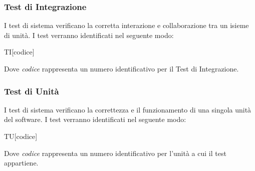 \documentclass[../piano-di-qualifica.tex]{subfiles}
\begin{document}
  \subsubsection{Test di Integrazione}
  \label{subs:integrazione}
    I test di sistema verificano la corretta interazione e collaborazione tra un isieme di unità. I test verranno identificati nel seguente modo:
    \begin{center}
      TI[codice]
    \end{center}
    Dove \textit{codice} rappresenta un numero identificativo per il Test di Integrazione.
  \subsubsection{Test di Unità}
  \label{subs:unita}
    I test di sistema verificano la correttezza e il funzionamento di una singola unità del software. I test verranno identificati nel seguente modo:
    \begin{center}
      TU[codice]
    \end{center}
    Dove \textit{codice} rappresenta un numero identificativo per l'unità a cui il test appartiene.
\end{document}
